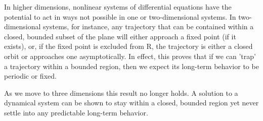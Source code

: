 \documentclass{report}
\begin{document}
	In higher dimensions, nonlinear systems of differential equations have the potential to act in ways not possible in one or two-dimensional systems. In two-dimensional systems, for instance, any trajectory that can be contained within a closed, bounded subset of the plane will either approach a fixed point (if it exists), or, if the fixed point is excluded from R, the trajectory is either a closed orbit or approaches one asymptotically. In effect, this proves that if we can 'trap' a trajectory within a bounded region, then we expect its long-term behavior to be periodic or fixed.
	
	As we move to three dimensions this result no longer holds. A solution to a dynamical system can be shown to stay within a closed, bounded region yet never settle into any predictable long-term behavior.
\end{document}
